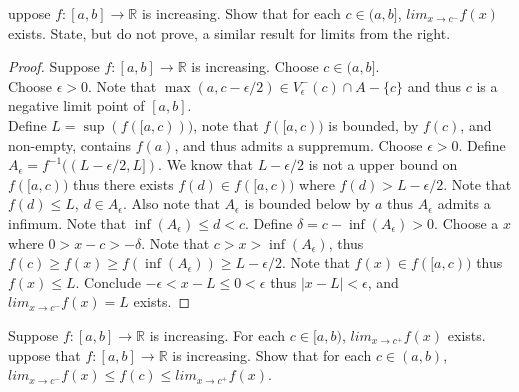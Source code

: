 \documentclass[12pt]{article}
\makeatletter
\theoremstyle{homework}
\newenvironment{exercise}[1]
{\def\@currentlabel{#1}\exercisecore}
{\endexercisecore}
\makeatother
\begin{document}
\begin{exercise}

Suppose $f : [a, b] \rightarrow \mathbb{R}$ is increasing. Show that for each $c \in (a, b]$, $lim_{x\rightarrow c^-} f (x)$ exists.  State, but do not prove, a similar result for limits from the right.\\
\end{exercise}
\begin{proof}
Suppose $f : [a, b] \rightarrow \mathbb{R}$ is increasing.  Choose $c \in (a, b]$.\\
Choose $\epsilon>0$.  Note that $\max(a,c-\epsilon/2)\in V^-_\epsilon(c)\cap A-\{c\}$ and thus $c$ is a negative limit point of $[a,b]$.\\
Define $L=\sup(f([a,c)))$, note that $f([a,c))$ is bounded, by $f(c)$, and non-empty, contains $f(a)$, and thus admits a suppremum.  Choose $\epsilon>0$.  Define $A_\epsilon=f^{-1}((L-\epsilon/2,L])$.  We know that $L-\epsilon/2$ is not a upper bound on $f([a,c))$ thus there exists $f(d)\in f([a,c))$ where $f(d)>L-\epsilon/2$.  Note that $f(d)\leq L$, $d\in A_\epsilon$.  Also note that $A_\epsilon$ is bounded below by $a$ thus $A_\epsilon$ admits a infimum.  Note that $\inf(A_\epsilon)\leq d<c$.  Define $\delta=c-\inf(A_\epsilon)>0$.  Choose a $x$ where $0>x-c>-\delta$.  Note that $c>x>\inf(A_\epsilon)$, thus $f(c)\geq f(x)\geq f(\inf(A_\epsilon))\geq L-\epsilon/2$.  Note that $f(x)\in f([a,c))$ thus $f(x)\leq L$.  Conclude $-\epsilon<x-L\leq 0<\epsilon$ thus $|x-L|<\epsilon$, and $lim_{x\rightarrow c^-} f (x)=L$ exists.
\end{proof}
Suppose $f : [a, b] \rightarrow \mathbb{R}$ is increasing. For each $c \in [a, b)$, $lim_{x\rightarrow c^+} f (x)$ exists.
\begin{exercise}

Suppose that $f : [a, b] \rightarrow \mathbb{R}$ is increasing. Show that for each $c \in (a, b)$, $lim_{x\rightarrow c^-} f (x) \leq f (c) \leq lim_{x\rightarrow c^+} f (x)$.\\
\end{exercise}
\end{document}

